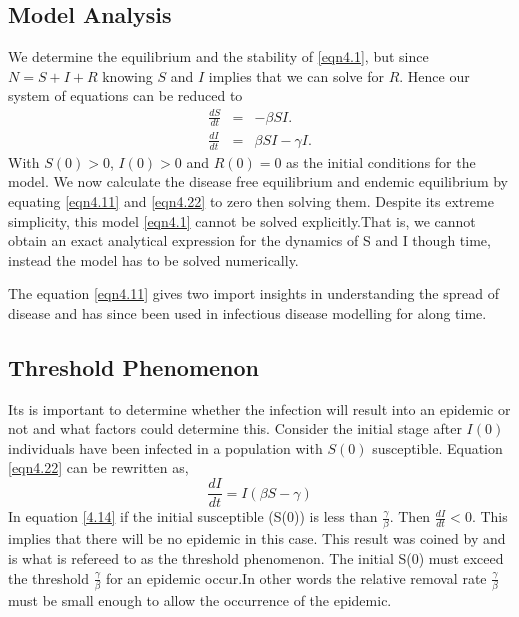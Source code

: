 \subsection{Model Analysis}
We determine the equilibrium and the stability of \ref{eqn4.1}, but since $N =S +I+R$ knowing $S$ and $I$ implies that we can solve for  $R$. Hence our system of equations can be reduced to 
\begin{align}
\frac{dS}{dt} &= &-\beta SI. \label{eqn4.11} \\
 \frac{dI}{dt} &=& \beta S I - \gamma  I \label{eqn4.22}.
\end{align}
 With $S(0) >0$, $I(0) > 0$ and $R(0) =0$ as the initial conditions for the model.
 We now calculate the disease free equilibrium and endemic equilibrium by equating \ref{eqn4.11} and \ref{eqn4.22} to zero then solving them. Despite its extreme simplicity, this model \ref{eqn4.1} cannot be solved explicitly.That is, we cannot obtain an exact analytical expression for the dynamics of S and I
though time, instead the model has to be solved numerically.

The equation \ref{eqn4.11} gives two import insights in understanding the spread of disease and has since been used in infectious disease modelling for along time.

\subsection{Threshold Phenomenon} 
Its is important to determine whether the infection will result into an epidemic or not and what factors could determine this. Consider the initial stage after $I(0)$ individuals have been infected in a population with $S(0)$ susceptible. Equation \ref{eqn4.22} can be rewritten as,
\begin{equation} 
\frac{dI}{dt} = I \left(\beta S -\gamma \right)\label{4.14}
\end{equation}
In equation \ref{4.14} if the initial susceptible (S(0)) is less than $\frac{\gamma}{\beta}$. Then $\frac{dI}{dt} < 0.$ This implies that there will be no epidemic in this case.
This result was coined by \cite{m1925applications} and  is what is refereed to as the threshold phenomenon. The initial S(0) must exceed the threshold $\frac{\gamma}{\beta}$ for an epidemic occur.In  other words the relative removal rate $\frac{\gamma}{\beta}$ must be small enough to allow the occurrence  of the epidemic.
 
